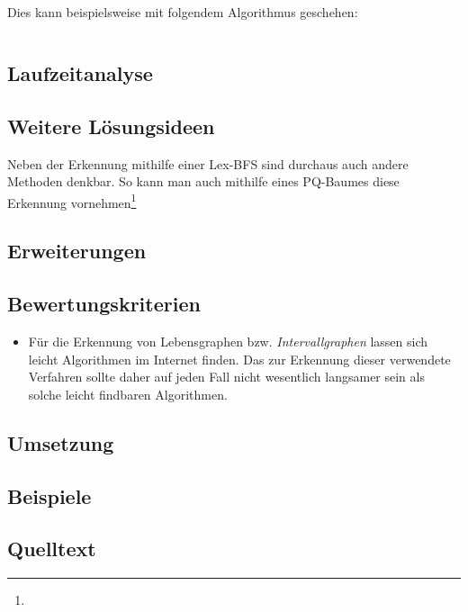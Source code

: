 Dies kann beispielsweise mit folgendem Algorithmus geschehen:

\begin{lstlisting}

\end{lstlisting}

\subsection{Laufzeitanalyse}

\subsection{Weitere Lösungsideen}

Neben der Erkennung mithilfe einer Lex-BFS sind durchaus auch andere Methoden denkbar. So kann man auch mithilfe eines PQ-Baumes diese Erkennung vornehmen\footnote{ }

\subsection{Erweiterungen}

\subsection{Bewertungskriterien}

\begin{itemize}
\item Für die Erkennung von Lebensgraphen bzw. \emph{Intervallgraphen} lassen sich leicht Algorithmen im Internet finden. Das zur Erkennung dieser verwendete Verfahren sollte daher auf jeden Fall nicht wesentlich langsamer sein als solche leicht findbaren Algorithmen.
\end{itemize}


 \subsection{Umsetzung}
\subsection{Beispiele}
\subsection{Quelltext}